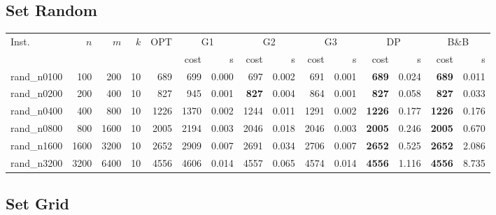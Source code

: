\subsection*{Set Random}
\begingroup\footnotesize\setlength{\tabcolsep}{2.6pt}\setlength{\LTpre}{2pt}
\begin{longtable}{@{}lrrrr@{\hspace{9pt}}rr@{\hspace{9pt}}rr@{\hspace{9pt}}rr@{\hspace{9pt}}rr@{\hspace{9pt}}rr@{}}\toprule
Inst. & \(n\) & \(m\) & \(k\) & OPT & \multicolumn{2}{c}{G1} & \multicolumn{2}{c}{G2} & \multicolumn{2}{c}{G3} & \multicolumn{2}{c}{DP} & \multicolumn{2}{c}{B\&B}\\
\cmidrule(l{6pt}){6-7}\cmidrule(l{6pt}){8-9}\cmidrule(l{6pt}){10-11}\cmidrule(l{6pt}){12-13}\cmidrule(l{6pt}){14-15}
 & & & & & cost & s & cost & s & cost & s & cost & s & cost & s\\\midrule\endhead
rand\_n0100 & 100 & 200 & 10 & 689 & 699 & 0.000 & 697 & 0.002 & 691 & 0.001 & \textbf{689} & 0.024 & \textbf{689} & 0.011\\
rand\_n0200 & 200 & 400 & 10 & 827 & 945 & 0.001 & \textbf{827} & 0.004 & 864 & 0.001 & \textbf{827} & 0.058 & \textbf{827} & 0.033\\
rand\_n0400 & 400 & 800 & 10 & 1226 & 1370 & 0.002 & 1244 & 0.011 & 1291 & 0.002 & \textbf{1226} & 0.177 & \textbf{1226} & 0.176\\
rand\_n0800 & 800 & 1600 & 10 & 2005 & 2194 & 0.003 & 2046 & 0.018 & 2046 & 0.003 & \textbf{2005} & 0.246 & \textbf{2005} & 0.670\\
rand\_n1600 & 1600 & 3200 & 10 & 2652 & 2909 & 0.007 & 2691 & 0.034 & 2706 & 0.007 & \textbf{2652} & 0.525 & \textbf{2652} & 2.086\\
rand\_n3200 & 3200 & 6400 & 10 & 4556 & 4606 & 0.014 & 4557 & 0.065 & 4574 & 0.014 & \textbf{4556} & 1.116 & \textbf{4556} & 8.735\\
\bottomrule\end{longtable}\endgroup
{}\subsection*{Set Grid}
\begingroup\footnotesize\setlength{\tabcolsep}{2.6pt}\setlength{\LTpre}{2pt}
